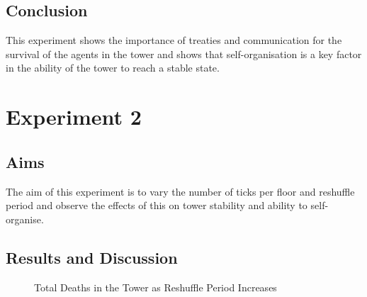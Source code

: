 \subsection{Conclusion}
\label{subsec: E1-Conclusion}
This experiment shows the importance of treaties and communication for the survival of the agents in the tower and shows that self-organisation is a key factor in the ability of the tower to reach a stable state.

\section{Experiment 2}
\label{subsec: Experiment 2}
\subsection{Aims}
\label{subsec: E2-Aims}
The aim of this experiment is to vary the number of ticks per floor and reshuffle period and observe the effects of this on tower stability and ability to self-organise.
\subsection{Results and Discussion}
\label{subsec: E2-Results and Discussion}

\begin{figure}[H] %
    \centering
    \begin{minipage}{0.8\textwidth}
    \end{minipage}
    \caption{Total Deaths in the Tower as Reshuffle Period Increases}
    \label{fig:Number-of-Deaths-As-Shuffle-Period-Decreases}
\end{figure}

